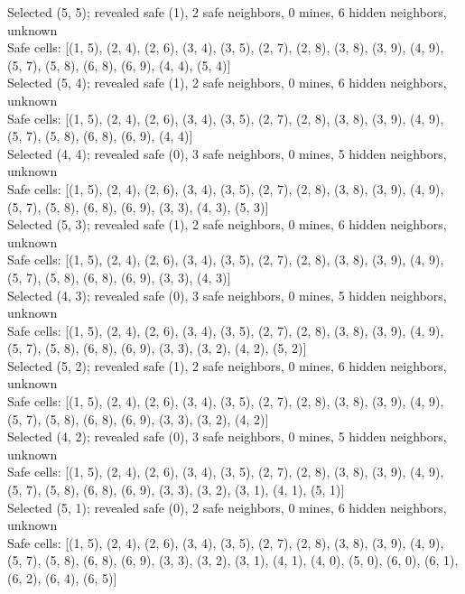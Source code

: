 \documentclass[11pt]{article} %
\begin{document}
Selected (5, 5); revealed safe (1), 2 safe neighbors, 0 mines, 6 hidden neighbors, unknown\\
Safe cells: [(1, 5), (2, 4), (2, 6), (3, 4), (3, 5), (2, 7), (2, 8), (3, 8), (3, 9), (4, 9), (5, 7), (5, 8), (6, 8), (6, 9), (4, 4), (5, 4)]\\
Selected (5, 4); revealed safe (1), 2 safe neighbors, 0 mines, 6 hidden neighbors, unknown\\
Safe cells: [(1, 5), (2, 4), (2, 6), (3, 4), (3, 5), (2, 7), (2, 8), (3, 8), (3, 9), (4, 9), (5, 7), (5, 8), (6, 8), (6, 9), (4, 4)]\\
Selected (4, 4); revealed safe (0), 3 safe neighbors, 0 mines, 5 hidden neighbors, unknown\\
Safe cells: [(1, 5), (2, 4), (2, 6), (3, 4), (3, 5), (2, 7), (2, 8), (3, 8), (3, 9), (4, 9), (5, 7), (5, 8), (6, 8), (6, 9), (3, 3), (4, 3), (5, 3)]\\
Selected (5, 3); revealed safe (1), 2 safe neighbors, 0 mines, 6 hidden neighbors, unknown\\
Safe cells: [(1, 5), (2, 4), (2, 6), (3, 4), (3, 5), (2, 7), (2, 8), (3, 8), (3, 9), (4, 9), (5, 7), (5, 8), (6, 8), (6, 9), (3, 3), (4, 3)]\\
Selected (4, 3); revealed safe (0), 3 safe neighbors, 0 mines, 5 hidden neighbors, unknown\\
Safe cells: [(1, 5), (2, 4), (2, 6), (3, 4), (3, 5), (2, 7), (2, 8), (3, 8), (3, 9), (4, 9), (5, 7), (5, 8), (6, 8), (6, 9), (3, 3), (3, 2), (4, 2), (5, 2)]\\
Selected (5, 2); revealed safe (1), 2 safe neighbors, 0 mines, 6 hidden neighbors, unknown\\
Safe cells: [(1, 5), (2, 4), (2, 6), (3, 4), (3, 5), (2, 7), (2, 8), (3, 8), (3, 9), (4, 9), (5, 7), (5, 8), (6, 8), (6, 9), (3, 3), (3, 2), (4, 2)]\\
Selected (4, 2); revealed safe (0), 3 safe neighbors, 0 mines, 5 hidden neighbors, unknown\\
Safe cells: [(1, 5), (2, 4), (2, 6), (3, 4), (3, 5), (2, 7), (2, 8), (3, 8), (3, 9), (4, 9), (5, 7), (5, 8), (6, 8), (6, 9), (3, 3), (3, 2), (3, 1), (4, 1), (5, 1)]\\
Selected (5, 1); revealed safe (0), 2 safe neighbors, 0 mines, 6 hidden neighbors, unknown\\
Safe cells: [(1, 5), (2, 4), (2, 6), (3, 4), (3, 5), (2, 7), (2, 8), (3, 8), (3, 9), (4, 9), (5, 7), (5, 8), (6, 8), (6, 9), (3, 3), (3, 2), (3, 1), (4, 1), (4, 0), (5, 0), (6, 0), (6, 1), (6, 2), (6, 4), (6, 5)]\\
\end{document}
